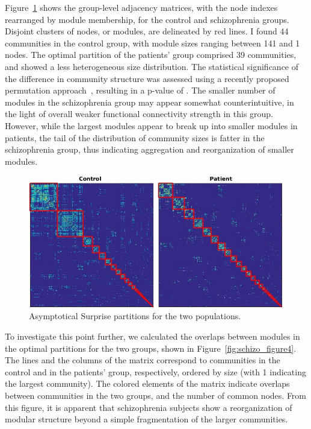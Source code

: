 Figure~\ref{fig:schizo_control_patients} shows the group-level adjacency matrices, with the node indexes rearranged by module membership, for the control and schizophrenia groups.
Disjoint clusters of nodes, or modules, are delineated by red lines.
I found 44 communities in the control group, with module sizes ranging between 141 and 1 nodes.
The optimal partition of the patients' group comprised 39 communities, and showed a less heterogeneous size distribution.
The statistical significance of the difference in community structure was assessed using a recently proposed permutation approach~\cite{alexander-bloch2012}, resulting in a p-value of .
The smaller number of modules in the schizophrenia group may appear somewhat counterintuitive, in the light of overall weaker functional connectivity strength in this group.
However, while the largest modules appear to break up into smaller modules in patients, the tail of the distribution of community sizes is fatter in the schizophrenia group, thus indicating aggregation and reorganization of smaller modules.
\begin{figure}
\centering
\includegraphics[width=\textwidth]{images/schizo/schizo_fig_3.jpg}
\caption{Asymptotical Surprise partitions for the two populations.}
\label{fig:schizo_control_patients}
\end{figure}
To investigate this point further, we calculated the overlaps between modules in the optimal partitions for the two groups, shown in Figure~\ref{fig:schizo_figure4}.
The lines and the columns of the matrix correspond to communities in the control and in the patients' group, respectively, ordered by size (with 1 indicating the largest community).
The colored elements of the matrix indicate overlaps between communities in the two groups, and the number of common nodes.
From this figure, it is apparent that schizophrenia subjects show a reorganization of modular structure beyond a simple fragmentation of the larger communities.
